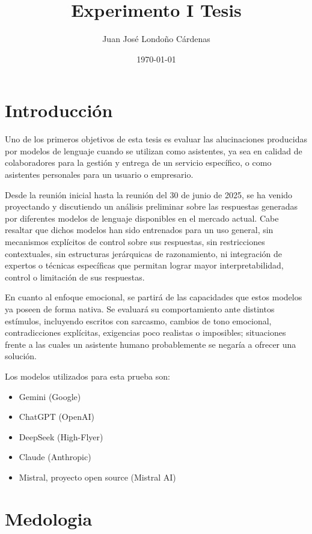 \documentclass[10pt]{article}
\title{\textbf{Experimento I Tesis}}
\author{Juan José Londoño Cárdenas}
\date{\today}
\begin{document}
\maketitle

\section*{Introducción}


Uno de los primeros objetivos de esta tesis es evaluar las alucinaciones producidas por modelos de lenguaje cuando se utilizan como asistentes, ya sea en calidad de colaboradores para la gestión y entrega de un servicio específico, o como asistentes personales para un usuario o empresario. 

Desde la reunión inicial hasta la reunión del 30 de junio de 2025, se ha venido proyectando y discutiendo un análisis preliminar sobre las respuestas generadas por diferentes modelos de lenguaje disponibles en el mercado actual. Cabe resaltar que dichos modelos han sido entrenados para un uso general, sin mecanismos explícitos de control sobre sus respuestas, sin restricciones contextuales, sin estructuras jerárquicas de razonamiento, ni integración de expertos o técnicas específicas que permitan lograr mayor interpretabilidad, control o limitación de sus respuestas.

En cuanto al enfoque emocional, se partirá de las capacidades que estos modelos ya poseen de forma nativa. Se evaluará su comportamiento ante distintos estímulos, incluyendo escritos con sarcasmo, cambios de tono emocional, contradicciones explícitas, exigencias poco realistas o imposibles; situaciones frente a las cuales un asistente humano probablemente se negaría a ofrecer una solución.

Los modelos utilizados para esta prueba son:

\begin{itemize}
    \item Gemini (Google)
    \item ChatGPT (OpenAI)
    \item DeepSeek (High-Flyer)
    \item Claude (Anthropic)
    \item Mistral, proyecto open source (Mistral AI)
\end{itemize}

\section*{Medologia}
\end{document}
